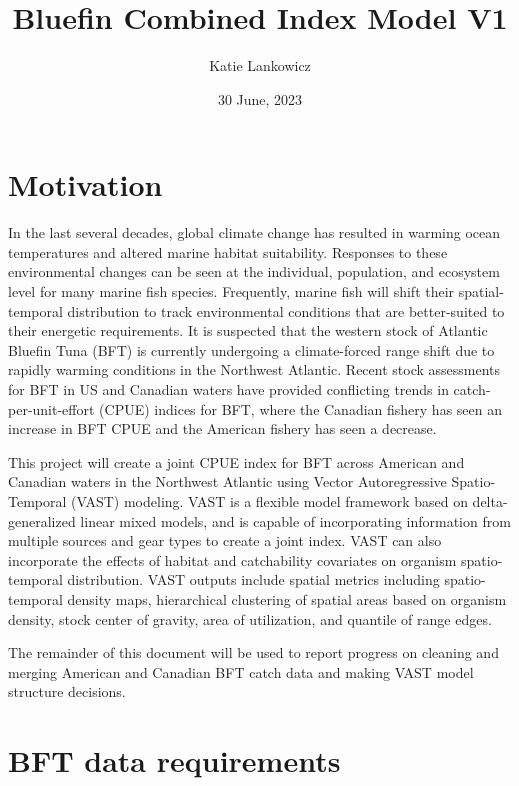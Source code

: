 \documentclass[
]{article}
\title{Bluefin Combined Index Model V1}
\author{Katie Lankowicz}
\date{30 June, 2023}
\begin{document}
\maketitle

{
\setcounter{tocdepth}{2}
\tableofcontents
}
\hypertarget{motivation}{%
\section{Motivation}\label{motivation}}

In the last several decades, global climate change has resulted in warming ocean temperatures and altered marine habitat suitability. Responses to these environmental changes can be seen at the individual, population, and ecosystem level for many marine fish species. Frequently, marine fish will shift their spatial-temporal distribution to track environmental conditions that are better-suited to their energetic requirements. It is suspected that the western stock of Atlantic Bluefin Tuna (BFT) is currently undergoing a climate-forced range shift due to rapidly warming conditions in the Northwest Atlantic. Recent stock assessments for BFT in US and Canadian waters have provided conflicting trends in catch-per-unit-effort (CPUE) indices for BFT, where the Canadian fishery has seen an increase in BFT CPUE and the American fishery has seen a decrease.

This project will create a joint CPUE index for BFT across American and Canadian waters in the Northwest Atlantic using Vector Autoregressive Spatio-Temporal (VAST) modeling. VAST is a flexible model framework based on delta-generalized linear mixed models, and is capable of incorporating information from multiple sources and gear types to create a joint index. VAST can also incorporate the effects of habitat and catchability covariates on organism spatio-temporal distribution. VAST outputs include spatial metrics including spatio-temporal density maps, hierarchical clustering of spatial areas based on organism density, stock center of gravity, area of utilization, and quantile of range edges.

The remainder of this document will be used to report progress on cleaning and merging American and Canadian BFT catch data and making VAST model structure decisions.

\hypertarget{bft-data-requirements}{%
\section{BFT data requirements}\label{bft-data-requirements}}
\end{document}
